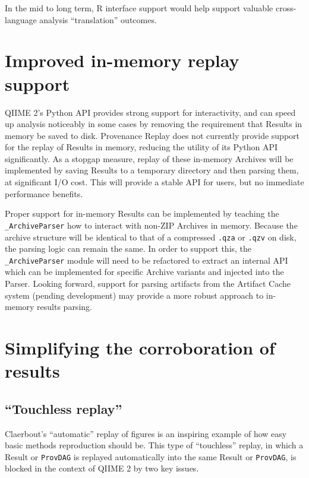 In the mid to long term, R interface support would help support valuable
cross-language analysis “translation” outcomes.

\section{Improved in-memory replay support \parencite[Issue 22]{keefe_issues_2021}}
QIIME 2’s Python API provides strong support for interactivity, and can speed up
analysis noticeably in some cases by removing the requirement that Results in
memory be saved to disk. Provenance Replay does not currently provide support
for the replay of Results in memory, reducing the utility of its Python API
significantly. As a stopgap measure, replay of these in-memory Archives will be
implemented by saving Results to a temporary directory and then parsing them, at
significant I/O cost. This will provide a stable API for users, but no immediate
performance benefits.

Proper support for in-memory Results can be implemented by teaching the
\texttt{\_ArchiveParser} how to interact with non-ZIP Archives in memory. Because the
archive structure will be identical to that of a compressed \texttt{.qza} or \texttt{.qzv} on
disk, the parsing logic can remain the same. In order to support this, the
\texttt{\_ArchiveParser} module will need to be refactored to extract an internal API
which can be implemented for specific Archive variants and injected into the
Parser. Looking forward, support for parsing artifacts from the Artifact Cache
system (pending development) may provide a more robust approach to in-memory
results parsing.

\section{Simplifying the corroboration of results}

\subsection{“Touchless replay” \parencite[Issue 63]{keefe_issues_2021}}
\label{touchless_replay}

Claerbout’s “automatic” replay of figures is an inspiring example of how easy
basic methods reproduction should be. This type of “touchless” replay, in which
a Result or \texttt{ProvDAG} is replayed automatically into the same Result or \texttt{ProvDAG},
is blocked in the context of QIIME 2 by two key issues.

